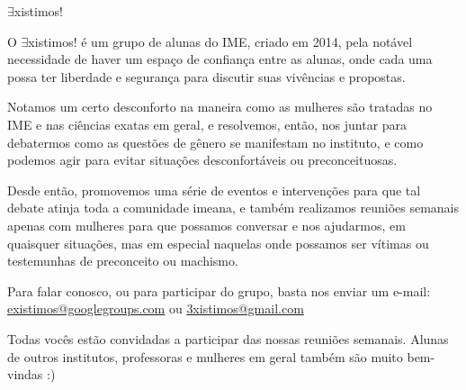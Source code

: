 \begin{subsecao}{$\exists$xistimos!}


O $\exists$xistimos! é um grupo de alunas do IME, criado em 2014, pela notável necessidade de haver um espaço de confiança entre as alunas, onde cada uma possa ter liberdade e segurança para discutir suas vivências e propostas.

Notamos um certo desconforto na maneira como as mulheres são tratadas no IME e nas ciências exatas em geral, e resolvemos, então, nos juntar para debatermos como as questões de gênero se manifestam no instituto, e como podemos agir para evitar situações desconfortáveis ou preconceituosas.

Desde então, promovemos uma série de eventos e intervenções para que tal debate atinja toda a comunidade imeana, e também realizamos reuniões semanais apenas com mulheres para que possamos conversar e nos ajudarmos, em quaisquer situações, mas em especial naquelas onde possamos ser vítimas ou testemunhas de preconceito ou machismo.

Para falar conosco, ou para participar do grupo, basta nos enviar um e-mail: \url{existimos@googlegroups.com} ou \url{3xistimos@gmail.com}

Todas vocês estão convidadas a participar das nossas reuniões semanais. Alunas de outros institutos, professoras e mulheres em geral também são muito bem-vindas :)

\end{subsecao}
